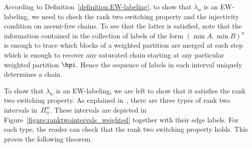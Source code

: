 According to Definition~\ref{definition:EW-labeling}, to show that $\lambda_w$ is an EW-labeling, we  need to check the rank two switching property and the injectivity condition on ascent-free chains.  To see that the latter is satisfied, note that the information contained in the collection of labels of the form $(\min A, \min B)^u$ is enough to trace which blocks of a weighted partition are merged at each step which is enough to recover any saturated chain starting at any particular weighted partition $\bpi$. Hence the sequence of labels in each interval 
uniquely determines a chain. 

To show that $\lambda_w$ is an EW-labeling, we are left to show that it 
satisfies the rank two switching property.
 As explained in~\cite{GonzalezDleonWachs2016}, there are three types of rank two intervals in~$\Pi_n^w$. These intervals are depicted in Figure~\ref{figure:ranktwointervals_weighted} together with their edge labels.   
 For each type, the reader can check that the rank two switching property holds. This proves the following theorem.

